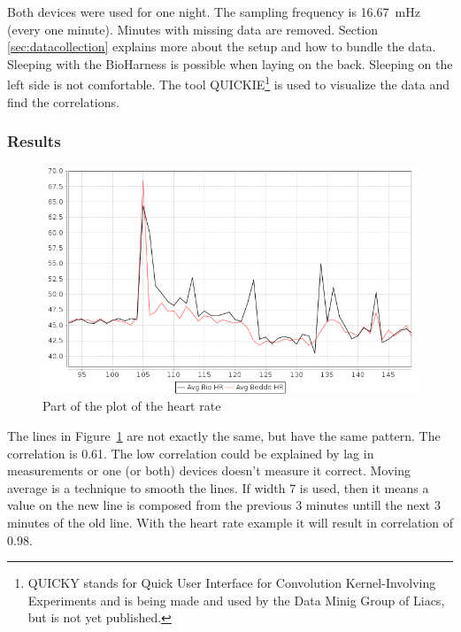 			Both devices were used for one night. The sampling frequency is \SI{16.67}{\milli\hertz} (every one minute). Minutes with missing data are removed. Section \ref{sec:datacollection} explains more about the setup and how to bundle the data. Sleeping with the BioHarness is possible when laying on the back. Sleeping on the left side is not comfortable. The tool QUICKIE\footnote{QUICKY stands for Quick User Interface for Convolution Kernel-Involving Experiments and is being made and used by the Data Minig Group of Liacs, but is not yet published.} is used to visualize the data and find the correlations.

		\subsubsection{Results}
			
			\begin{figure}[h]
				\centering
					\includegraphics[scale=0.5]{avgbiovsavgbeddit.png}
					
				\caption{Part of the plot of the heart rate}
				\label{fig:avgbiovsavgbeddit}

			\end{figure}

			The lines in Figure~\ref{fig:avgbiovsavgbeddit} are not exactly the same, but have the same pattern. The correlation is 0.61. The low correlation could be explained by lag in measurements or one (or both) devices doesn't measure it correct. Moving average is a technique to smooth the lines. If width 7 is used, then it means a value on the new line is composed from the previous 3 minutes untill the next 3 minutes of the old line. With the heart rate example it will result in correlation of 0.98.\
						
